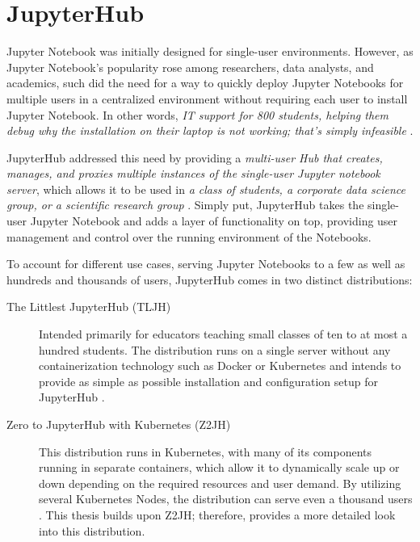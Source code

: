 \documentclass[
  digital,     %
  oneside,     %
  nosansbold,  %
  nocolorbold, %
  lof,         %
  lot,         %
]{fithesis4}
\begin{document}
\section{JupyterHub}
\label{sec:jupyterhub}
Jupyter Notebook was initially designed for single-user environments. However, as Jupyter Notebook's popularity rose among researchers, data analysts, and academics, such did the need for a way to quickly deploy Jupyter Notebooks for multiple users in a centralized environment without requiring each user to install Jupyter Notebook. In other words, \emph{IT support for 800 students, helping them debug why the installation on their laptop is not working; that's simply infeasible} \cite{perkel2018jupyter}.

JupyterHub addressed this need by providing a \emph{multi-user Hub that creates, manages, and proxies multiple instances of the single-user Jupyter notebook server}, which allows it to be used in \emph{a class of students, a corporate data science group, or a scientific research group} \cite{jupyterhub}. Simply put, JupyterHub takes the single-user Jupyter Notebook and adds a layer of functionality on top, providing user management and control over the running environment of the Notebooks.

To account for different use cases, serving Jupyter Notebooks to a few as well as hundreds and thousands of users, JupyterHub comes in two distinct distributions:
\begin{description}

    \item[The Littlest JupyterHub (TLJH)]
    Intended primarily for educators teaching small classes of ten to at most a hundred students. The distribution runs on a single server without any containerization technology such as Docker or Kubernetes and intends to provide as simple as possible installation and configuration setup for JupyterHub \cite{littlest_jupyterhub}.

    \item[Zero to JupyterHub with Kubernetes (Z2JH)]
    This distribution runs in Kubernetes, with many of its components running in separate containers, which allow it to dynamically scale up or down depending on the required resources and user demand. By utilizing several Kubernetes Nodes, the distribution can serve even a thousand users \cite{jupyterhub}. This thesis builds upon Z2JH; therefore,  provides a more detailed look into this distribution.
    
\end{description}
\end{document}
